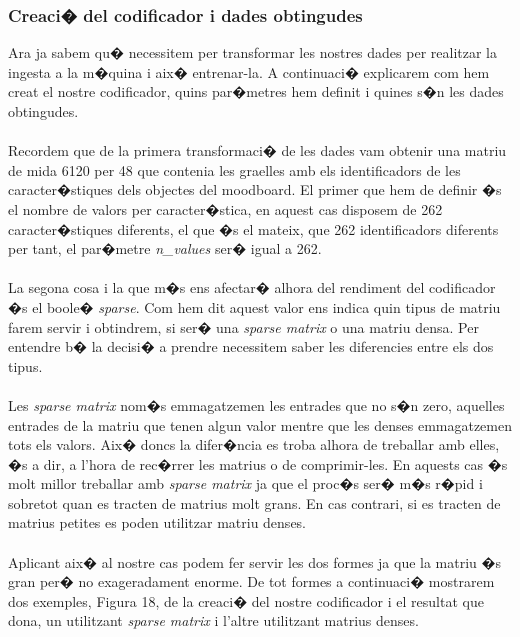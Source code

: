 \documentclass[12pt,a4paper,openright,oneside]{article}
\numberwithin{equation}{section}
\theoremstyle{definition}
\begin{document}
\subsubsection{Creaci� del codificador i dades obtingudes}
Ara ja sabem qu� necessitem per transformar les nostres dades per realitzar la ingesta a la m�quina i aix� entrenar-la. A continuaci� explicarem com hem creat el nostre codificador, quins par�metres hem definit i quines s�n les dades obtingudes.\\\\
Recordem que de la primera transformaci� de les dades vam obtenir una matriu de mida 6120 per 48 que contenia les graelles amb els identificadors de les caracter�stiques dels objectes del moodboard. El primer que hem de definir �s el nombre de valors per caracter�stica, en aquest cas disposem de 262 caracter�stiques diferents, el que �s el mateix, que 262 identificadors diferents per tant, el par�metre \textit{n\_values} ser� igual a 262. \\\\
La segona cosa i la que m�s ens afectar� alhora del rendiment del codificador �s el boole� \textit{sparse}. Com hem dit aquest valor ens indica quin tipus de matriu farem servir i obtindrem, si ser� una \textit{sparse matrix} o una matriu densa. Per entendre b� la decisi� a prendre necessitem saber les diferencies entre els dos tipus. \\\\
Les \textit{sparse matrix} nom�s emmagatzemen les entrades que no s�n zero, aquelles entrades de la matriu que tenen algun valor mentre que les denses emmagatzemen tots els valors. Aix� doncs la difer�ncia es troba alhora de treballar amb elles, �s a dir, a l'hora de rec�rrer les matrius o de comprimir-les. En aquests cas �s molt millor treballar amb \textit{sparse matrix} ja que el proc�s ser� m�s r�pid i sobretot quan es tracten de matrius molt grans. En cas contrari, si es tracten de matrius petites es poden utilitzar matriu denses. \\\\
Aplicant aix� al nostre cas podem fer servir les dos formes ja que la matriu �s gran per� no exageradament enorme. De tot formes a continuaci� mostrarem dos exemples, Figura 18, de la creaci� del nostre codificador i el resultat que dona, un utilitzant \textit{sparse matrix} i l'altre utilitzant matrius denses.
\end{document}
